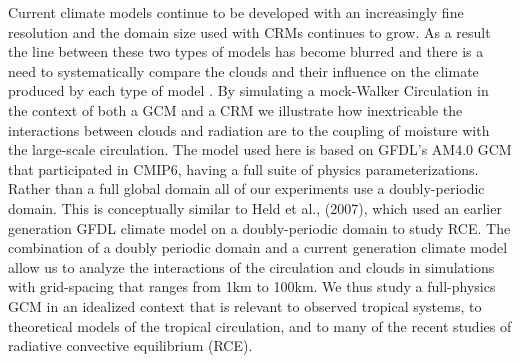 \documentclass[draft]{agujournal2019}
\begin{document}
Current climate models continue to be developed with an increasingly fine resolution and 
the domain size used with CRMs continues to grow.  As a result the line between these two types 
of models has become blurred and there is a need to systematically compare the clouds and their 
influence on the climate produced by each type of model \cite{Schneider_etal_2017}.
By simulating a mock-Walker Circulation in the context of both a GCM and a CRM we 
illustrate how inextricable the interactions between clouds and radiation are to the coupling 
of moisture with the large-scale circulation.     
The model used here is based on GFDL's AM4.0 GCM that participated in CMIP6, having a full suite of physics parameterizations.  
Rather than a full global domain all of our experiments use a doubly-periodic domain.    
This is conceptually similar to Held et al., (2007), which used an earlier generation GFDL climate model on a doubly-periodic domain to study RCE.   
The combination of a doubly periodic domain and a current generation climate model allow us to analyze the interactions of the 
circulation and clouds in simulations with grid-spacing that ranges from 1km to 100km.  
We thus study a full-physics GCM in an idealized context that is relevant to observed tropical systems, to theoretical
models of the tropical circulation, and to many of the recent studies of radiative convective equilibrium (RCE).   


\end{document}
